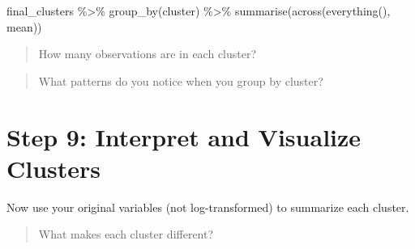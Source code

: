 \documentclass[
  11pt,
]{article}
\newenvironment{Shaded}{\begin{snugshade}}{\end{snugshade}}
\newcommand{\AttributeTok}[1]{\textcolor[rgb]{0.40,0.45,0.13}{#1}}
\newcommand{\DecValTok}[1]{\textcolor[rgb]{0.68,0.00,0.00}{#1}}
\newcommand{\FunctionTok}[1]{\textcolor[rgb]{0.28,0.35,0.67}{#1}}
\newcommand{\NormalTok}[1]{\textcolor[rgb]{0.00,0.23,0.31}{#1}}
\newcommand{\OtherTok}[1]{\textcolor[rgb]{0.00,0.23,0.31}{#1}}
\newcommand{\SpecialCharTok}[1]{\textcolor[rgb]{0.37,0.37,0.37}{#1}}
\begin{document}
\begin{Shaded}
\end{Shaded}

\begin{Shaded}
\begin{Highlighting}[]
\NormalTok{final\_clusters }\SpecialCharTok{\%\textgreater{}\%}
  \FunctionTok{group\_by}\NormalTok{(cluster) }\SpecialCharTok{\%\textgreater{}\%}
  \FunctionTok{summarise}\NormalTok{(}\FunctionTok{across}\NormalTok{(}\FunctionTok{everything}\NormalTok{(), mean))}
\end{Highlighting}
\end{Shaded}

\begin{quote}
How many observations are in each cluster?
\end{quote}

\vspace{2em}

\begin{quote}
What patterns do you notice when you group by cluster?
\end{quote}

\vspace{2em}

\section*{Step 9: Interpret and Visualize
Clusters}\label{step-9-interpret-and-visualize-clusters}

Now use your original variables (not log-transformed) to summarize each
cluster.

\begin{quote}
What makes each cluster different?
\end{quote}

\vspace{2em}
\end{document}
